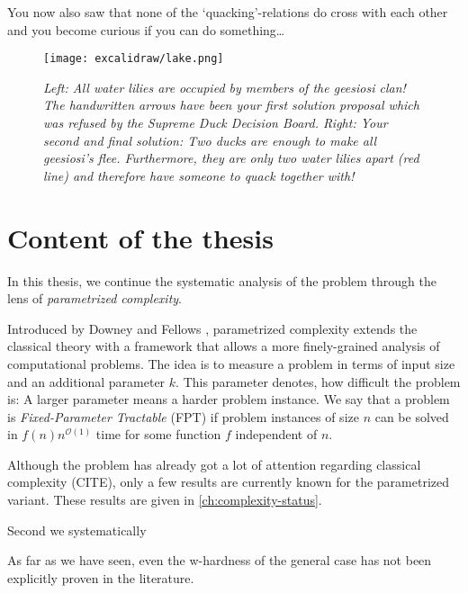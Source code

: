 You now also saw that none of the `quacking'-relations do cross with each other and you become curious if you can do something\ldots

\begin{figure}[ht]
    \centering
    \texttt{[image: excalidraw/lake.png]}
    \caption[Introductions: Merganser Lake. Own Drawing. Embedded icons under public domain from {\href{https://creazilla.com/}{https://creazilla.com/}}]{\textit{Left: All water lilies are occupied by members of the \textit{geesiosi} clan! The handwritten arrows have been your first solution proposal which was refused by the \textit{Supreme Duck Decision Board}.
    Right: Your second and final solution: Two ducks are enough to make all \textit{geesiosi}'s flee. Furthermore, they are only two water lilies apart (red line) and therefore have someone to quack together with!}}
    \label{fig:duck-lake}
\end{figure}

\section{Content of the thesis}

In this thesis, we continue the systematic analysis of the \sdom problem through the lens of \textit{parametrized complexity}.


Introduced by Downey and Fellows \cite{Downey1999a}, parametrized complexity extends the classical theory with a framework that allows a more finely-grained analysis of computational problems. The idea is to measure a problem in terms of input size and an additional parameter $k$. This parameter denotes, how difficult the problem is: A larger parameter means a harder problem instance. We say that a problem is \textit{Fixed-Parameter Tractable} (FPT) if problem instances of size $n$ can be solved in $f(n)n^{\mathcal{O}(1)}$ time for some function $f$ independent of $n$. 

Although the \sdom problem has already got a lot of attention regarding classical complexity (CITE), only a few results are currently known for the parametrized variant. These results are given in \cref{ch:complexity-status}.



Second we systematically 

As far as we have seen, even the w-hardness of the general case has not been explicitly proven in the literature. 

